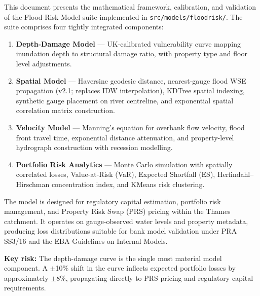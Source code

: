 \documentclass[11pt,a4paper]{article}
\begin{document}
\mkmtitlepage
\mkmlegalpage
\tableofcontents
\clearpage

\mkmexecsummary

This document presents the mathematical framework, calibration, and validation of the
Flood Risk Model suite implemented in \texttt{src/models/floodrisk/}. The suite comprises
four tightly integrated components:

\begin{enumerate}[nosep]
    \item \textbf{Depth-Damage Model} --- UK-calibrated vulnerability curve mapping inundation
          depth to structural damage ratio, with property type and floor level adjustments.
    \item \textbf{Spatial Model} --- Haversine geodesic distance, nearest-gauge flood WSE
          propagation (v2.1; replaces IDW interpolation), KDTree spatial indexing, synthetic
          gauge placement on river centreline, and exponential spatial correlation matrix construction.
    \item \textbf{Velocity Model} --- Manning's equation for overbank flow velocity, flood
          front travel time, exponential distance attenuation, and property-level hydrograph
          construction with recession modelling.
    \item \textbf{Portfolio Risk Analytics} --- Monte Carlo simulation with spatially
          correlated losses, Value-at-Risk (VaR), Expected Shortfall (ES), Herfindahl--Hirschman
          concentration index, and KMeans risk clustering.
\end{enumerate}

\noindent The model is designed for regulatory capital estimation, portfolio risk management,
and Property Risk Swap (PRS) pricing within the Thames catchment. It operates on gauge-observed
water levels and property metadata, producing loss distributions suitable for bank model
validation under PRA SS3/16 and the EBA Guidelines on Internal Models.

\textbf{Key risk:} The depth-damage curve is the single most material model component. A
$\pm$10\% shift in the curve inflects expected portfolio losses by approximately
$\pm$8\%, propagating directly to PRS pricing and regulatory capital requirements.

\mkmpurpose
\end{document}
